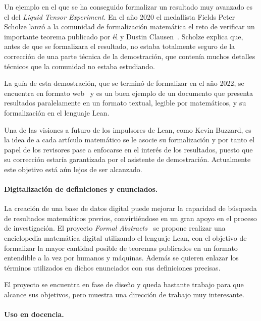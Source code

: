 Un ejemplo en el que se ha conseguido formalizar un resultado muy avanzado es el
del \textit{Liquid Tensor Experiment}. En el año 2020 el medallista Fields
Peter Scholze lanzó a la comunidad de formalización matemática el reto
de verificar un importante teorema publicado por él y Dustin
Clausen~\cite{scholzeLiquidTensorExperiment2022}. Scholze explica que, antes de
que se formalizara el resultado, no estaba totalmente seguro de la corrección de
una parte técnica de la demostración, que contenía muchos detalles técnicos que
la comunidad no estaba estudiando.

La guía de esta demostración, que se terminó de formalizar en el año 2022, se
encuentra en formato web~\cite{scholzeBlueprintLiquidTensor} y es un buen
ejemplo de un documento que presenta resultados paralelamente en un formato
textual, legible por matemáticos, y su formalización en el lenguaje
Lean.

Una de las visiones a futuro de los impulsores de Lean, como Kevin Buzzard, es
la idea de a cada artículo matemático se le asocie su formalización y por tanto
el papel de los revisores pase a enfocarse en el interés de los resultados,
puesto que su corrección estaría garantizada por el asistente de demostración.
Actualmente este objetivo está aún lejos de ser alcanzado.

\paragraph{Digitalización de definiciones y enunciados.}

La creación de una base de datos digital puede mejorar la capacidad de búsqueda
de resultados matemáticos previos, convirtiéndose en un gran apoyo en el proceso
de investigación. El proyecto \textit{Formal
	Abstracts}~\cite{halesFormalAbstracts} se propone realizar una enciclopedia
matemática digital utilizando el lenguaje Lean, con el objetivo de formalizar la
mayor cantidad posible de teoremas publicados en un formato entendible a la vez
por humanos y máquinas. Además se quieren enlazar los términos utilizados en
dichos enunciados con sus definiciones precisas.

El proyecto se encuentra en fase de diseño y queda bastante trabajo para que
alcance sus objetivos, pero muestra una dirección de trabajo muy interesante.

\paragraph{Uso en docencia.}


